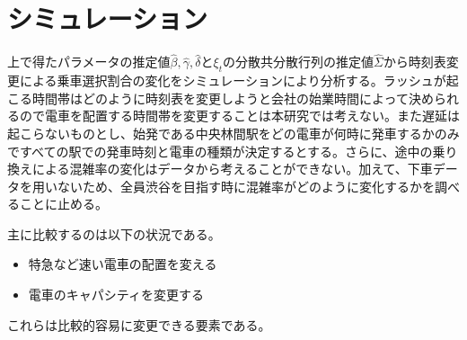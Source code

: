 \documentclass{jsarticle}
\begin{document}
\begin{comment}
$\eta_m^t = \left( \eta_{1,m}^t\ \cdots\ \eta_{C_m-1, m}^t\right)$とする。第一段階で得た$\Sigma$の推定値を$\hat{\Sigma}$と書くと、これを上に代入することで$Var(\eta_m^t)$の推定値を作ることができる。すなわち

\begin{align*}
&\begin{cases}
	&Var(\eta_{c,m}^t) = \left\{ \left( \frac{1}{\mu_{c,m}^t} \right)^2 \sum_{c^{'} = c+1}^{C_m-1} \left( w_{c^{'},m}^t \right)^2  + 1\right\} \hat{\Sigma}_{m, m} \quad \text{where $c \neq C_m-1$}\\[8pt]
	&Var(\eta_{C_m-1,m}^t) = \hat{\Sigma}_{m,m}
\end{cases}\\[8pt]
&\begin{cases}
	&Cov(\eta_{c,m}^t, \eta_{c^{'},m}^t) = \left\{\frac{1}{\mu_{c,m}^t \mu_{c^{'},m}^t} \sum_{c^{'} = c+1}^{C_m-1} \left( w_{c^{'},m}^t \right)^2  - \frac{w_{c,m}^t}{\mu_{c^{'},m}^t} \right\} \hat{\Sigma}_{m,m}\quad \text{where $c \neq C_m-1$}\\[8pt]
	&Cov(\eta_{C_m-1,m}^t, \eta_{c^{'},m}^t) = -\frac{w_{C_m-1,m}^t}{\mu_{c^{'},m}^t} \hat{\Sigma}_{m,m}
\end{cases}
\end{align*}
である。これを使って、$t$についてスタックした（3）式に対して駅$m$ごとにGLS推定を行うことで$\beta_m$をそれぞれ推定することができる。以上の二段階によりパラメータの推定値$\hat{\beta}, \hat{\gamma}, \hat{\delta}$と$\xi_t$の分散共分散行列の推定値$\hat{\Sigma}$を得ることができた。
\end{comment}

\section{シミュレーション}
上で得たパラメータの推定値$\hat{\beta}, \hat{\gamma}, \hat{\delta}$と$\xi_t$の分散共分散行列の推定値$\hat{\Sigma}$から時刻表変更による乗車選択割合の変化をシミュレーションにより分析する。ラッシュが起こる時間帯はどのように時刻表を変更しようと会社の始業時間によって決められるので電車を配置する時間帯を変更することは本研究では考えない。また遅延は起こらないものとし、始発である中央林間駅をどの電車が何時に発車するかのみですべての駅での発車時刻と電車の種類が決定するとする。さらに、途中の乗り換えによる混雑率の変化はデータから考えることができない。加えて、下車データを用いないため、全員渋谷を目指す時に混雑率がどのように変化するかを調べることに止める。

主に比較するのは以下の状況である。
\begin{itemize}
	\item 特急など速い電車の配置を変える
	\item 電車のキャパシティを変更する
\end{itemize}
これらは比較的容易に変更できる要素である。
\end{document}
